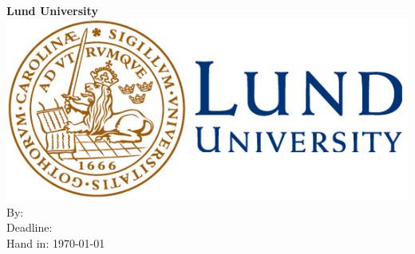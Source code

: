 \documentclass{article}
\begin{document}
\begin{titlepage} 
	\begin{center}
		\vspace{10mm}
		\Large{\textbf{      }}\\ %
		\Large{\textbf{Lund University}}\\
		\includegraphics[scale=0.5]{LundUniversity_logo2.png} 
		\vfill
		\Large {By: }\\ %
		{Deadline:    } \\
		 {Hand in: \today}\\
	\end{center}
\end{titlepage}
\newpage
\end{document}

